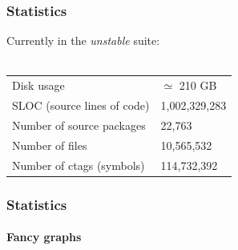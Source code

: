 \documentclass{beamer}
\begin{document}
\begin{frame}
  \frametitle{Statistics}
  Currently in the \textit{unstable} suite:
  ~\\ ~\\
  \begin{tabular}{ l | l }
    \alert{Disk usage} & $\simeq$ 210 GB\\
    \alert{SLOC} (source lines of code) & 1,002,329,283\\
    Number of \alert{source packages} & 22,763\\
    Number of \alert{files} & 10,565,532\\
    Number of \alert{ctags} (symbols) & 114,732,392\\
  \end{tabular}
\end{frame}

\begin{frame}
  \frametitle{Statistics}
  \framesubtitle{Fancy graphs}
\end{frame}
  
\end{document}
